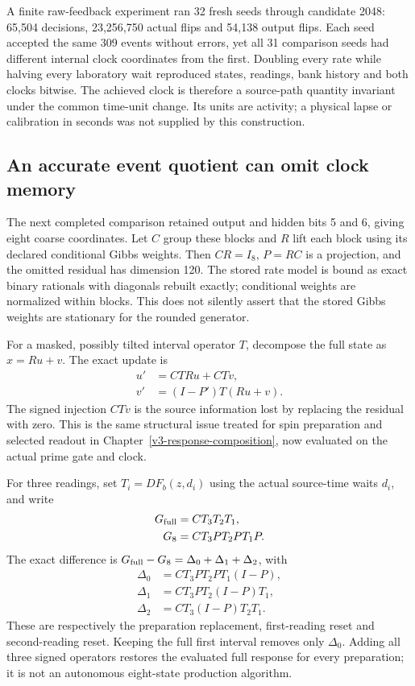 A finite raw-feedback experiment ran 32 fresh seeds through candidate 2048: 65,504 decisions, 23,256,750 actual flips and 54,138 output flips. Each seed accepted the same 309 events without errors, yet all 31 comparison seeds had different internal clock coordinates from the first. Doubling every rate while halving every laboratory wait reproduced states, readings, bank history and both clocks bitwise. The achieved clock is therefore a source-path quantity invariant under the common time-unit change. Its units are activity; a physical lapse or calibration in seconds was not supplied by this construction.

\subsection{An accurate event quotient can omit clock memory}

The next completed comparison retained output and hidden bits 5 and 6, giving eight coarse coordinates. Let $C$ group these blocks and $R$ lift each block using its declared conditional Gibbs weights. Then $CR=I_8$, $P=RC$ is a projection, and the omitted residual has dimension 120. The stored rate model is bound as exact binary rationals with diagonals rebuilt exactly; conditional weights are normalized within blocks. This does not silently assert that the stored Gibbs weights are stationary for the rounded generator.

For a masked, possibly tilted interval operator $T$, decompose the full state as $x=Ru+v$. The exact update is
\begin{align*}
 u'&=CTR u+CTv,\\
 v'&=(I-P')T(Ru+v).
\end{align*}
The signed injection $CTv$ is the source information lost by replacing the residual with zero. This is the same structural issue treated for spin preparation and selected readout in Chapter~\ref{v3-response-composition}, now evaluated on the actual prime gate and clock.

For three readings, set $T_i=D F_b(z,d_i)$ using the actual source-time waits $d_i$, and write
\begin{align*}
 G_{\rm full}&=CT_3T_2T_1,\\
 G_8&=CT_3PT_2PT_1P.
\end{align*}
The exact difference is $G_{\rm full}-G_8=\Delta_0+\Delta_1+\Delta_2$, with
\begin{align*}
 \Delta_0&=CT_3PT_2PT_1(I-P),\\
 \Delta_1&=CT_3PT_2(I-P)T_1,\\
 \Delta_2&=CT_3(I-P)T_2T_1.
\end{align*}
These are respectively the preparation replacement, first-reading reset and second-reading reset. Keeping the full first interval removes only $\Delta_0$. Adding all three signed operators restores the evaluated full response for every preparation; it is not an autonomous eight-state production algorithm.

